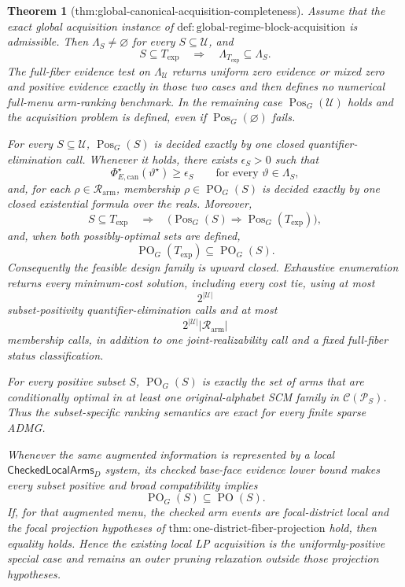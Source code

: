 \documentclass{article}
\newtheorem{theorem}{Theorem}
\begin{document}
\begin{theorem}[thm:global-canonical-acquisition-completeness]\label{thm:global-canonical-acquisition-completeness}
Assume that the exact global acquisition instance of \(\mathrm{def:global\text{-}regime\text{-}block\text{-}acquisition}\) is admissible.  Then \(\Lambda_S\ne\varnothing\) for every \(S\subseteq\mathcal U\), and
\[
S\subseteq T_{\mathrm{exp}}
\quad\Longrightarrow\quad
\Lambda_{T_{\mathrm{exp}}}\subseteq\Lambda_S.
\]
The full-fiber evidence test on \(\Lambda_{\mathcal U}\) returns uniform zero evidence or mixed zero and positive evidence exactly in those two cases and then defines no numerical full-menu arm-ranking benchmark.  In the remaining case \(\operatorname{Pos}_G(\mathcal U)\) holds and the acquisition problem is defined, even if \(\operatorname{Pos}_G(\varnothing)\) fails.

For every \(S\subseteq\mathcal U\), \(\operatorname{Pos}_G(S)\) is decided exactly by one closed quantifier-elimination call.  Whenever it holds, there exists \(\epsilon_S>0\) such that
\[
\Phi_{E,\mathrm{can}}^\star(\vartheta^\star)\geq\epsilon_S
\qquad\text{for every }\vartheta\in\Lambda_S,
\]
and, for each \(\rho\in\mathcal R_{\mathrm{arm}}\), membership \(\rho\in\operatorname{PO}_G(S)\) is decided exactly by one closed existential formula over the reals.  Moreover,
\[
S\subseteq T_{\mathrm{exp}}
\quad\Longrightarrow\quad
\bigl(\operatorname{Pos}_G(S)\Longrightarrow
\operatorname{Pos}_G(T_{\mathrm{exp}})\bigr),
\]
and, when both possibly-optimal sets are defined,
\[
\operatorname{PO}_G(T_{\mathrm{exp}})
\subseteq\operatorname{PO}_G(S).
\]
Consequently the feasible design family is upward closed.  Exhaustive enumeration returns every minimum-cost solution, including every cost tie, using at most
\[
2^{|\mathcal U|}
\]
subset-positivity quantifier-elimination calls and at most
\[
2^{|\mathcal U|}|\mathcal R_{\mathrm{arm}}|
\]
membership calls, in addition to one joint-realizability call and a fixed full-fiber status classification.

For every positive subset \(S\), \(\operatorname{PO}_G(S)\) is exactly the set of arms that are conditionally optimal in at least one original-alphabet SCM family in \(\mathcal C(\mathcal P_S)\).  Thus the subset-specific ranking semantics are exact for every finite sparse ADMG.

Whenever the same augmented information is represented by a local \(\mathsf{CheckedLocalArms}_D\) system, its checked base-face evidence lower bound makes every subset positive and broad compatibility implies
\[
\operatorname{PO}_G(S)\subseteq\operatorname{PO}(S).
\]
If, for that augmented menu, the checked arm events are focal-district local and the focal projection hypotheses of \(\mathrm{thm:one\text{-}district\text{-}fiber\text{-}projection}\) hold, then equality holds.  Hence the existing local LP acquisition is the uniformly-positive special case and remains an outer pruning relaxation outside those projection hypotheses.


\end{theorem}
\end{document}
